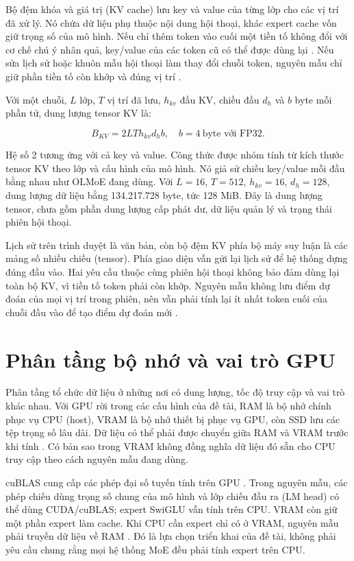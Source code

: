 Bộ đệm khóa và giá trị (KV cache) lưu key và value của từng lớp cho các vị trí đã xử lý. Nó chứa dữ liệu phụ thuộc nội dung hội thoại, khác expert cache vốn giữ trọng số của mô hình. Nếu chỉ thêm token vào cuối một tiền tố không đổi với cơ chế chú ý nhân quả, key/value của các token cũ có thể được dùng lại \cite{hf_kv_cache}. Nếu sửa lịch sử hoặc khuôn mẫu hội thoại làm thay đổi chuỗi token, nguyên mẫu chỉ giữ phần tiền tố còn khớp và đúng vị trí \cite{moe_tierengine_arch}.

Với một chuỗi, $L$ lớp, $T$ vị trí đã lưu, $h_{kv}$ đầu KV, chiều đầu $d_h$ và $b$ byte mỗi phần tử, dung lượng tensor KV là:

\begin{equation}
\label{eq:2.9}
B_{KV}=2LTh_{kv}d_hb,\quad b=4\ \text{byte với FP32}.
\end{equation}

Hệ số 2 tương ứng với cả key và value. Công thức được nhóm tính từ kích thước tensor KV theo lớp \cite{hf_kv_cache} và cấu hình của mô hình. Nó giả sử chiều key/value mỗi đầu bằng nhau như OLMoE đang dùng. Với $L=16$, $T=512$, $h_{kv}=16$, $d_h=128$, dung lượng dữ liệu bằng 134.217.728 byte, tức 128 MiB. Đây là dung lượng tensor, chưa gồm phần dung lượng cấp phát dư, dữ liệu quản lý và trạng thái phiên hội thoại.

Lịch sử trên trình duyệt là văn bản, còn bộ đệm KV phía bộ máy suy luận là các mảng số nhiều chiều (tensor). Phía giao diện vẫn gửi lại lịch sử để hệ thống dựng đúng đầu vào. Hai yêu cầu thuộc cùng phiên hội thoại không bảo đảm dùng lại toàn bộ KV, vì tiền tố token phải còn khớp. Nguyên mẫu không lưu điểm dự đoán của mọi vị trí trong phiên, nên vẫn phải tính lại ít nhất token cuối của chuỗi đầu vào để tạo điểm dự đoán mới \cite{moe_tierengine_arch}.

\section{Phân tầng bộ nhớ và vai trò GPU}

Phân tầng tổ chức dữ liệu ở những nơi có dung lượng, tốc độ truy cập và vai trò khác nhau. Với GPU rời trong các cấu hình của đề tài, RAM là bộ nhớ chính phục vụ CPU (host), VRAM là bộ nhớ thiết bị phục vụ GPU, còn SSD lưu các tệp trọng số lâu dài. Dữ liệu có thể phải được chuyển giữa RAM và VRAM trước khi tính \cite{cuda_memory}. Có bản sao trong VRAM không đồng nghĩa dữ liệu đó sẵn cho CPU truy cập theo cách nguyên mẫu đang dùng.

cuBLAS cung cấp các phép đại số tuyến tính trên GPU \cite{nvidia_cublas}. Trong nguyên mẫu, các phép chiếu dùng trọng số chung của mô hình và lớp chiếu đầu ra (LM head) có thể dùng CUDA/cuBLAS; expert SwiGLU vẫn tính trên CPU. VRAM còn giữ một phần expert làm cache. Khi CPU cần expert chỉ có ở VRAM, nguyên mẫu phải truyền dữ liệu về RAM \cite{moe_tierengine_arch}. Đó là lựa chọn triển khai của đề tài, không phải yêu cầu chung rằng mọi hệ thống MoE đều phải tính expert trên CPU.

